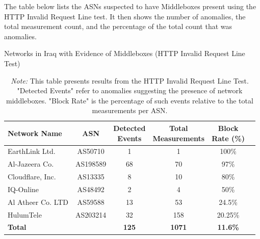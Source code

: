 The table below lists the ASNs suspected to have Middleboxes present using the HTTP Invalid Request Line test. It then shows the number of anomalies, the total measurement count, and the percentage of the total count that was anomalies.

\vspace{2em}

\begin{table}[H]
\centering
\caption{Networks in Iraq with Evidence of Middleboxes (HTTP Invalid Request Line Test)}
\begin{tabular}{lccccc}
\toprule
\textbf{Network Name} & \textbf{ASN} & \shortstack{\textbf{Detected} \\ \textbf{Events}} & \shortstack{\textbf{Total} \\ \textbf{Measurements}} & \shortstack{\textbf{Block} \\ \textbf{Rate (\%)}} \\
\midrule
EarthLink Ltd.        & AS50710   & 1  & 1   & 100\%    \\
Al-Jazeera Co.        & AS198589  & 68 & 70  & 97\%     \\
Cloudflare, Inc.      & AS13335   & 8  & 10  & 80\%     \\
IQ-Online             & AS48492   & 2  & 4   & 50\%     \\
Al Atheer Co. LTD     & AS59588   & 13 & 53  & 24.5\%   \\
HulumTele             & AS203214  & 32 & 158 & 20.25\%  \\
\bottomrule
\textbf{Total} & & \textbf{125} & \textbf{1071} & \textbf{11.6\%} \\
\end{tabular}

\vspace{1em}

\caption*{\textit{Note:} This table presents results from the HTTP Invalid Request Line Test. "Detected Events" refer to anomalies suggesting the presence of network middleboxes. "Block Rate" is the percentage of such events relative to the total measurements per ASN.}
\label{tab:middlebox_http_invalid}
\end{table}



